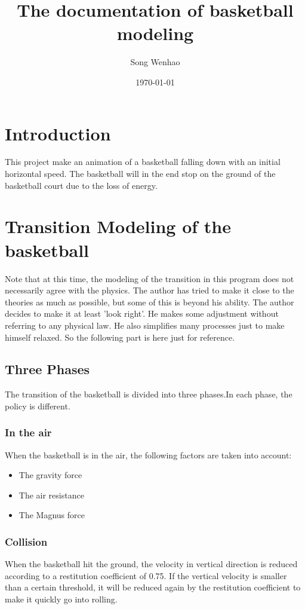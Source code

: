 \documentclass[10pt,a4paper]{article}
\begin{document}
\title{The documentation of basketball modeling}
\author{Song Wenhao}
\date{\today}
\maketitle
\section{Introduction}
This project make an animation of a basketball falling down with an initial horizontal speed. The basketball will in the end stop on the ground of the basketball court due to the loss of energy.

\section{Transition Modeling of the basketball}
Note that at this time, the modeling of the transition in this program does not necessarily agree with the physics. The author has tried to make it close to the theories as much as possible, but some of this is beyond his ability. The author decides to make it at least 'look right'. He makes some adjustment without referring to any physical law. He also simplifies many processes just to make himself relaxed. So the following part is here just for reference.

\subsection{Three Phases}
The transition of the basketball is divided into three phases.In each phase, the policy is different.
\subsubsection{In the air}
When the basketball is in the air, the following factors are taken into account:
\begin{itemize}
\item The gravity force
\item The air resistance
\item The Magnus force
\end{itemize}

\subsubsection{Collision}
When the basketball hit the ground, the velocity in vertical direction is reduced according to a restitution coefficient of 0.75. If the vertical velocity is smaller than a certain threshold, it will be reduced again by the restitution coefficient to make it quickly go into rolling.
\end{document}
